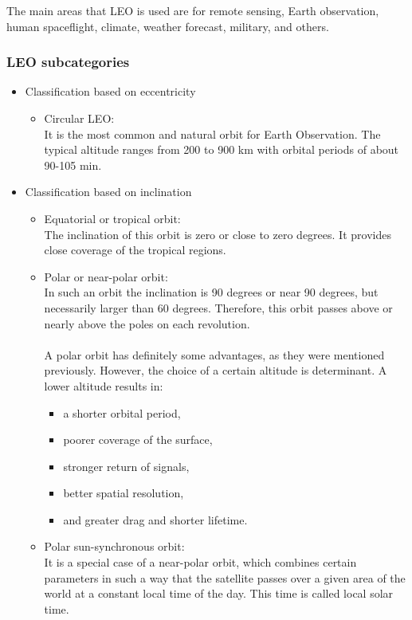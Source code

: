 The main areas that LEO is used are for remote sensing, Earth observation, human spaceflight, climate, weather forecast, military, and others. 

\pagebreak
\subsubsection{LEO subcategories}
\bigskip

\begin{itemize}
\item Classification based on eccentricity
	\begin{itemize}
	\item Circular LEO: \\
	It is the most common and natural orbit for Earth Observation. The typical altitude ranges from 200 to 900 km with orbital periods of about 90-105 min.
	\end{itemize}
\item Classification based on inclination
	\begin{itemize}
	\item Equatorial or tropical orbit: \\
	The inclination of this orbit is zero or close to zero degrees. It provides close coverage of the tropical regions.
	\item Polar or near-polar orbit: \\
	In such an orbit the inclination is 90 degrees or near 90 degrees, but necessarily larger than 60 degrees. Therefore, this orbit passes above or nearly above the poles on each revolution. \\ %
	\\
	A polar orbit has definitely some advantages, as they were mentioned previously. However, the choice of a certain altitude is determinant. A lower altitude results in:
		\begin{itemize}
		\item a shorter orbital period,
		\item poorer coverage of the surface,
		\item stronger return of signals,
		\item better spatial resolution,
		\item and greater drag and shorter lifetime.
		\end{itemize}
	\item Polar sun-synchronous orbit: \\
	It is a special case of a near-polar orbit, which combines certain parameters in such a way that the satellite passes over a given area of the world at a constant local time of the day. This time is called local solar time.
	

\end{itemize}
\end{itemize}
